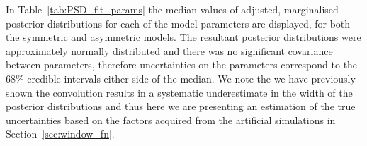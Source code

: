 In Table~\ref{tab:PSD_fit_params} the median values of adjusted, marginalised posterior distributions for each of the model parameters are displayed, for both the symmetric and asymmetric models. The resultant posterior distributions were approximately normally distributed and there was no significant covariance between parameters, therefore uncertainties on the parameters correspond to the $68 \%$ credible intervals either side of the median. We note the we have previously shown the convolution results in a systematic underestimate in the width of the posterior distributions and thus here we are presenting an estimation of the true uncertainties based on the factors acquired from the artificial simulations in Section~\ref{sec:window_fn}.




